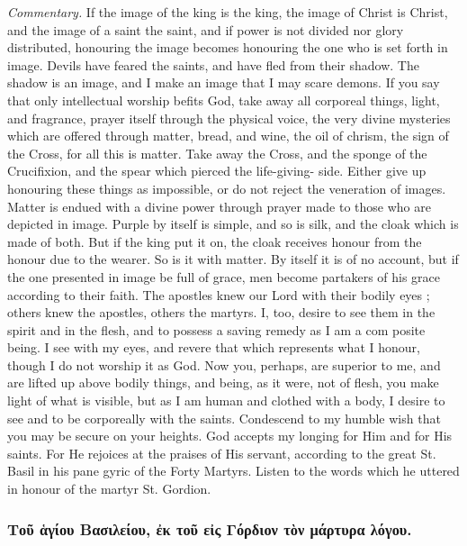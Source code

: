 \documentclass[10pt]{book}
\newcommand{\switchGreek}[1][]{\selectlanguage{polutonikogreek} \switchcolumn*[#1]}
\begin{document}
\begin{paracol}{2}
\emph{Commentary.}
If the image of the king is 
the king, the image of Christ is Christ, and 
the image of a saint the saint, and if power 
is not divided nor glory distributed, honouring 
the image becomes honouring the one who is 
set forth in image. Devils have feared the 
saints, and have fled from their shadow. The 
shadow is an image, and I make an image 
that I may scare demons. If you say that 
only intellectual worship befits God, take away 
all corporeal things, light, and fragrance, prayer 
itself through the physical voice, the very divine 
mysteries which are offered through matter, 
bread, and wine, the oil of chrism, the sign of 
the Cross, for all this is matter. Take away 
the Cross, and the sponge of the Crucifixion, 
and the spear which pierced the life-giving- 
side. Either give up honouring these things 
as impossible, or do not reject the veneration 
of images. Matter is endued with a divine 
power through prayer made to those who are 
depicted in image. Purple by itself is simple, 
and so is silk, and the cloak which is made of 
both. But if the king put it on, the cloak 
receives honour from the honour due to the 
wearer. So is it with matter. By itself it is of 
no account, but if the one presented in image be 
full of grace, men become partakers of his grace 
according to their faith. The apostles knew 
our Lord with their bodily eyes ; others knew 
the apostles, others the martyrs. I, too, desire 
to see them in the spirit and in the flesh, and 
to possess a saving remedy as I am a com 
posite being. I see with my eyes, and revere 
that which represents what I honour, though I 
do not worship it as God. Now you, perhaps, 
are superior to me, and are lifted up above 
bodily things, and being, as it were, not of 
flesh, you make light of what is visible, but 
as I am human and clothed with a body, I 
desire to see and to be corporeally with the 
saints. Condescend to my humble wish that 
you may be secure on your heights. God 
accepts my longing for Him and for His saints. 
For He rejoices at the praises of His servant, 
according to the great St. Basil in his pane 
gyric of the Forty Martyrs. Listen to the 
words which he uttered in honour of the martyr 
St. Gordion. 

\switchGreek

\subsubsection*{Τοῦ ἁγίου Βασιλείου, ἐκ τοῦ εἰς Γόρδιον τὸν μάρτυρα λόγου.}


\end{paracol}
\end{document}
